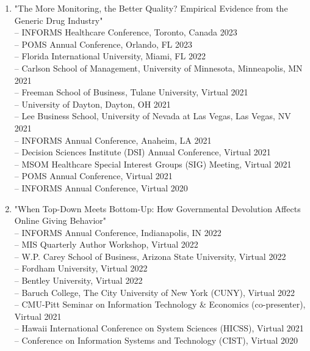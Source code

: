 \documentclass[margin,line]{resume}
\begin{document}
\begin{resume}
\begin{enumerate}[topsep=0pt, leftmargin=*]
         \item "The More Monitoring, the Better Quality? Empirical Evidence from the Generic Drug Industry"\\[0.3em]
         -- INFORMS Healthcare Conference, Toronto, Canada \hfill   2023\\
  	     -- POMS Annual Conference, Orlando, FL \hfill   2023\\
               -- Florida International University, Miami, FL \hfill 2022\\
               -- Carlson School of Management, University of Minnesota, Minneapolis, MN \hfill 2021\\
               -- Freeman School of Business, Tulane University, Virtual \hfill 2021\\
               -- University of Dayton, Dayton, OH \hfill 2021\\
               -- Lee Business School, University of Nevada at Las Vegas, Las Vegas, NV \hfill 2021\\
               -- INFORMS Annual Conference, Anaheim, LA \hfill 2021\\
               -- Decision Sciences Institute (DSI) Annual Conference, Virtual \hfill 2021\\
               -- MSOM Healthcare Special Interest Groups (SIG) Meeting, Virtual \hfill2021\\
               -- POMS Annual Conference, Virtual \hfill2021\\
               -- INFORMS Annual Conference, Virtual \hfill2020\\

 	     \item "When Top-Down Meets Bottom-Up: How Governmental Devolution Affects Online Giving Behavior"\\[0.3em]
 	          -- INFORMS Annual Conference, Indianapolis, IN \hfill  2022\\
 	          -- MIS Quarterly Author Workshop, Virtual \hfill 2022\\
 	           -- W.P. Carey School of Business, Arizona State University, Virtual \hfill2022\\
 	           -- Fordham University, Virtual  \hfill2022\\
 	           -- Bentley University, Virtual  \hfill2022\\
 	           -- Baruch College, The City University of New York (CUNY), Virtual \hfill2022\\
 	           -- CMU-Pitt Seminar on Information Technology \& Economics (co-presenter), Virtual \hfill2021\\
 	           -- Hawaii International Conference on System Sciences (HICSS), Virtual \hfill2021\\
 	           -- Conference on Information Systems and Technology (CIST), Virtual \hfill2020\\ 	      
\newpage


\end{enumerate}
\end{resume}
\end{document}
